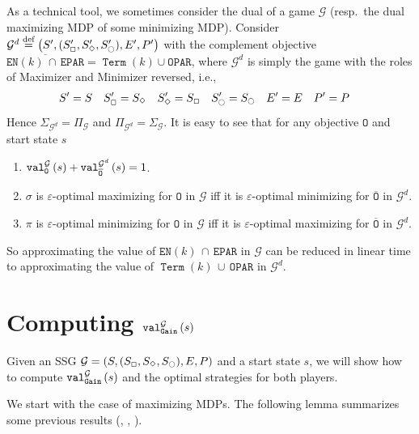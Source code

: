 \documentclass[a4paper,UKenglish,cleveref,autoref,thm-restate]{lipics-v2021}
\DeclareMathOperator{\Term}{\mathtt{Term}}
\DeclareMathOperator{\Gain}{\mathtt{Gain}}
\newcommand{\Eparity}{\mathtt{EPAR}}
\newcommand{\Oparity}{\mathtt{OPAR}}
\newcommand{\en}{\mathtt{EN}}
\newcommand{\+}[1]{\mathbb{#1}}
\newcommand{\?}[1]{\mathcal{#1}}
\newcommand{\rsymbol}{\ocircle}
\newcommand{\zsymbol}{\Box}
\newcommand{\osymbol}{\Diamond}
\newcommand{\zstates}{\states_\zsymbol}
\newcommand{\rstates}{\states_\rsymbol}
\newcommand{\ostates}{\states_\osymbol}
\newcommand{\eqby}[2][=]{\stackrel{\text{{\tiny{#2}}}}{#1}}
\newcommand{\eqdef}{\eqby{def}}
\newcommand{\eps}{\varepsilon}
\newcommand{\obj}{\mathtt{O}}
\newcommand{\lrc}[1]{\left(#1\right)}
\newcommand{\tuple}[1]{\lrc{#1}}
\newcommand{\game}{{\mathcal G}}
\newcommand{\gametuple}{\tuple{\states,(\zstates,\ostates,\rstates),\transition,\probp}}
\newcommand{\gametupleprime}{\tuple{\states',(\zstates',\ostates',\rstates'),\transition',\probp'}}
\newcommand{\states}{S}
\newcommand{\s}{s}
\newcommand{\transition}{{E}}
\newcommand{\probp}{P}
\newcommand{\complementof}[1]{\overline{#1}}
\newcommand{\zstrat}{\sigma}
\newcommand{\ostrat}{\pi}
\newcommand{\zallstrats}[1]{\zstratset_{{#1}}}
\newcommand{\oallstrats}[1]{\ostratset_{{#1}}}
\newcommand{\zstratset}{\Sigma}
\newcommand{\ostratset}{\Pi}
\begin{document}
As a technical tool, we sometimes consider the dual of a game $\game$
(resp.\ the dual maximizing MDP of some minimizing MDP).
Consider $\game^{d} \eqdef \gametupleprime$
with the complement objective
$\complementof{\en(k)\,\cap\,\Eparity} = \Term(k) \cup \Oparity$,
where $\game^{d}$ is simply the game with the roles of Maximizer and
Minimizer reversed, i.e.,
\begin{align*}
    \states' &= \states &
    \zstates' &= \ostates &
    \ostates' &= \zstates &
    \rstates' &= \rstates &                       
    \transition' &= \transition &
    \probp' &= \probp
\end{align*}
Hence $\zallstrats{\game^{d}} = \oallstrats{\game}$ and
$\oallstrats{\game^{d}} = \zallstrats{\game}$.
It is easy to see that for any objective $\obj$ and start state $\s$
\begin{enumerate}
    \item $\valueof[\game][\obj]{\s} + \valueof[\game^{d}][\complementof{\obj}]{\s} = 1$.
    \item $\zstrat$ is $\eps$-optimal maximizing for $\obj$ in $\game$ iff it is $\eps$-optimal minimizing for $\complementof{\obj}$ in $\game^{d}$.
    \item $\ostrat$ is $\eps$-optimal minimizing for $\obj$ in $\game$ iff it is $\eps$-optimal maximizing for $\complementof{\obj}$ in $\game^{d}$.
\end{enumerate}
So approximating the value of $\en(k)\, \cap\, \Eparity$
in $\game$ can be reduced in linear time to approximating
the value of $\Term(k)\, \cup\, \Oparity$ in $\game^{d}$.


\section{Computing \texorpdfstring{$\valueof[\game][\Gain]{\s}$}{Value of Gain}}\label{sec:Gain}

Given an SSG $\game = \gametuple$ and a start state $\s$,
we will show how to compute $\valueof[\game][\Gain]{\s}$
and the optimal strategies for both players.

We start with the case of maximizing MDPs.
The following lemma summarizes some previous results
(\cite[Lemmas 30,16]{MSTW2021}, \cite[Lemma 26]{MSTW2017},
\cite[Proposition 4]{Gimbert2011ComputingOS}).
\end{document}
